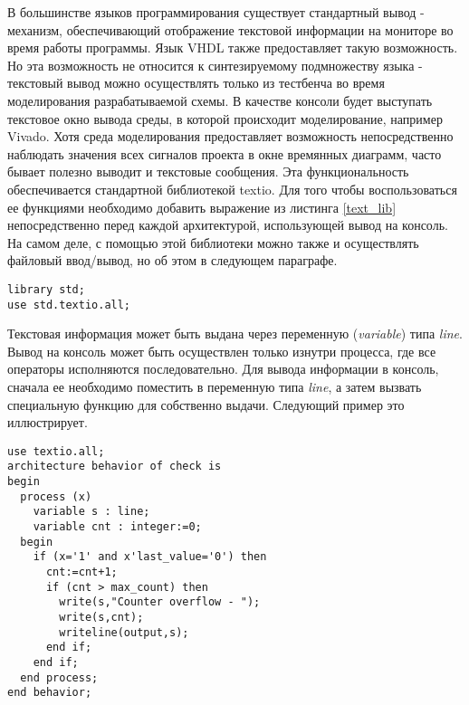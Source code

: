 В большинстве языков программирования существует стандартный вывод - механизм, обеспечивающий отображение текстовой информации на мониторе во время работы программы. Язык VHDL также предоставляет такую возможность. Но эта возможность не относится к синтезируемому подмножеству языка - текстовый вывод можно осуществлять только из тестбенча во время моделирования разрабатываемой схемы. В качестве консоли будет выступать текстовое окно вывода среды, в которой происходит моделирование, например Vivado. Хотя среда моделирования предоставляет возможность непосредственно наблюдать значения всех сигналов проекта в окне времянных диаграмм, часто бывает полезно выводит и текстовые сообщения. Эта функциональность обеспечивается стандартной библиотекой textio. Для того чтобы воспользоваться ее функциями необходимо добавить выражение из листинга \ref{text_lib} непосредственно перед каждой архитектурой, использующей вывод на консоль. На самом деле, с помощью этой библиотеки можно также и осуществлять файловый ввод/вывод, но об этом в следующем параграфе.

\begin{Code}
\begin{lstlisting}[caption=Объявление библиотеки textio,label=text_lib]
library std;
use std.textio.all;
\end{lstlisting}
\end{Code}


Текстовая информация может быть выдана через переменную (\emph{variable}) типа \emph{line}. Вывод на консоль может быть осуществлен только изнутри процесса, где все операторы исполняются последовательно. Для вывода информации в консоль, сначала ее необходимо поместить в переменную типа \emph{line}, а затем вызвать специальную функцию для собственно выдачи. Следующий пример это иллюстрирует.

\begin{Code}
\begin{lstlisting}[caption=Вывод в консоль]
use textio.all;
architecture behavior of check is
begin
  process (x)
    variable s : line;
    variable cnt : integer:=0;
  begin
    if (x='1' and x'last_value='0') then
      cnt:=cnt+1;
      if (cnt > max_count) then
        write(s,"Counter overflow - ");
        write(s,cnt);
        writeline(output,s);
      end if;
    end if;
  end process;
end behavior;
\end{lstlisting}
\end{Code}


